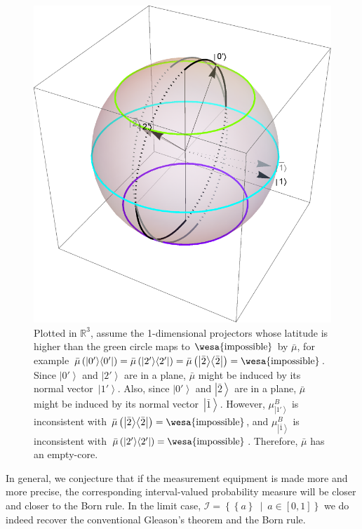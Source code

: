 \documentclass{article}
\theoremstyle{remark}
\newcommand{\imposs}{{\mbox{\wesa{impossible}}}}
\newcommand{\ket}[1]{{\left\vert{#1}\right\rangle}}
\newcommand{\op}[2]{\ensuremath{\left\vert{#1}\middle\rangle\middle\langle{#2}\right\vert}}
\newcommand{\proj}[1]{\op{#1}{#1}}
\newcommand{\set}[2]{\ensuremath{\left\{ {#1}~\middle|~{#2}\right\} }}
\begin{document}
\begin{figure}
\begin{centering}
\includegraphics[scale=0.38]{measure3-1} 
\par\end{centering}
\caption{\label{fig:three-dimensional-3-value-1}Plotted in $\mathbb{R}^{3}$,
assume the 1-dimensional projectors whose latitude is higher than
the green circle maps to $\imposs$ by $\bar{\mu}$, for example $\bar{\mu}\left(\proj{0'}\right)=\bar{\mu}\left(\proj{2'}\right)=\bar{\mu}\left(\proj{\bar{2}}\right)=\imposs$.
Since $\ket{0'}$ and $\ket{2'}$ are in a plane, $\bar{\mu}$ might
be induced by its normal vector~$\ket{1'}$. Also, since $\ket{0'}$
and $\ket{\bar{2}}$ are in a plane, $\bar{\mu}$ might be induced
by its normal vector~$\ket{\bar{1}}$. However, $\mu_{\ket{1'}}^{B}$
is inconsistent with $\bar{\mu}\left(\proj{\bar{2}}\right)=\imposs$,
and $\mu_{\ket{\bar{1}}}^{B}$ is inconsistent with $\bar{\mu}\left(\proj{2'}\right)=\imposs$.
Therefore, $\bar{\mu}$ has an empty-core.}
\end{figure}

In general, we conjecture that if the measurement equipment is made
more and more precise, the corresponding interval-valued probability
measure will be closer and closer to the Born rule. In the limit case,
$\mathscr{I}=\set{\left\{ a\right\} }{a\in\left[0,1\right]}$ we do
indeed recover the conventional Gleason's theorem and the Born rule.
\end{document}
